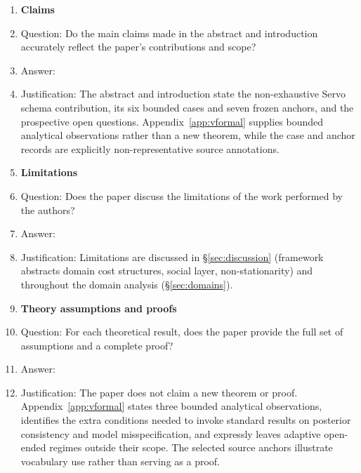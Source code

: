 \documentclass{article}
\begin{document}
\begin{enumerate}

\item {\bf Claims}
    \item[] Question: Do the main claims made in the abstract and introduction accurately reflect the paper's contributions and scope?
    \item[] Answer: \answerYes{}
    \item[] Justification: The abstract and introduction state the non-exhaustive Servo schema contribution, its six bounded cases and seven frozen anchors, and the prospective open questions. Appendix~\ref{app:vformal} supplies bounded analytical observations rather than a new theorem, while the case and anchor records are explicitly non-representative source annotations.

\item {\bf Limitations}
    \item[] Question: Does the paper discuss the limitations of the work performed by the authors?
    \item[] Answer: \answerYes{}
    \item[] Justification: Limitations are discussed in \S\ref{sec:discussion} (framework abstracts domain cost structures, social layer, non-stationarity) and throughout the domain analysis (\S\ref{sec:domains}).

\item {\bf Theory assumptions and proofs}
    \item[] Question: For each theoretical result, does the paper provide the full set of assumptions and a complete proof?
    \item[] Answer: \answerNA{}
    \item[] Justification: The paper does not claim a new theorem or proof. Appendix~\ref{app:vformal} states three bounded analytical observations, identifies the extra conditions needed to invoke standard results on posterior consistency and model misspecification, and expressly leaves adaptive open-ended regimes outside their scope. The selected source anchors illustrate vocabulary use rather than serving as a proof.


\end{enumerate}
\end{document}
